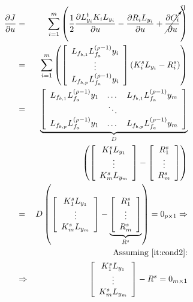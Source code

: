 \documentclass[letterpaper, 10 pt, conference]{ieeeconf}  %
\begin{document}
\begin{eqnarray*}
\frac{\partial J}{\partial u} &=& \sum_{i=1}^m \left(\frac{1}{2}\frac{\partial L_{y_i}^tK_iL_{y_i}}{\partial u} - \frac{\partial R_iL_{y_i}}{\partial u} + \cancelto{0}{\frac{\partial C_i}{\partial u}}\right)\\
&=& \sum_{i=1}^m \left(
\left[\begin{array}{c}
L_{f_{b,1}}L_{f_a}^{(\rho-1)}y_i\\
\vdots\\
L_{f_{b,p}}L_{f_a}^{(\rho-1)}y_i
\end{array}\right]
(K^s_iL_{y_i} - R_i^s)\right)\\
&=& \underbrace{\left[\begin{array}{ccc}
L_{f_{b,1}}L_{f_a}^{(\rho-1)}y_1 & \dots & L_{f_{b,1}}L_{f_a}^{(\rho-1)}y_m\\
& \ddots &\\
L_{f_{b,p}}L_{f_a}^{(\rho-1)}y_1 & \dots & L_{f_{b,p}}L_{f_a}^{(\rho-1)}y_m
\end{array}\right]}_{D}\\
&&\left(\left[\begin{array}{c}
K_1^sL_{y_1}\\
\vdots\\
K_m^sL_{y_m}
\end{array}\right] -\left[\begin{array}{c}
R_1^s\\
\vdots\\
R_m^s
\end{array}\right] \right)\\
&=& D \left(\left[\begin{array}{c}
K_1^sL_{y_1}\\
\vdots\\
K_m^sL_{y_m}
\end{array}\right]-\underbrace{\left[\begin{array}{c}
R_1^s\\
\vdots\\
R_m^s
\end{array}\right]}_{R^s} \right) = 0_{p\times1} \Rightarrow\\
&&\text{Assuming \ref{it:cond2}:}\\
&\Rightarrow & \left[\begin{array}{c}
K_1^sL_{y_1}\\
\vdots\\
K_m^sL_{y_m}
\end{array}\right]-R^s = 0_{m\times1}\\

\end{eqnarray*}
\end{document}
